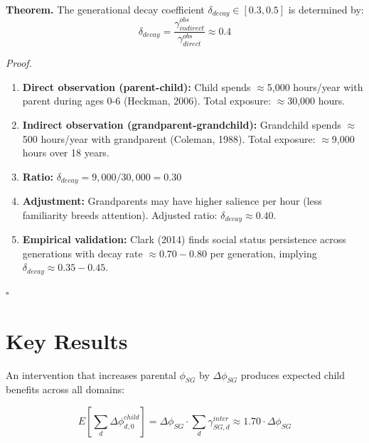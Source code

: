 \begin{tcolorbox}[colback=green!5!white, colframe=green!75!black, title=Theorem BI-T3: Generational Decay]
\textbf{Theorem.} The generational decay coefficient $\delta_{decay} \in [0.3, 0.5]$ is determined by:
\begin{equation}
\delta_{decay} = \frac{\gamma^{obs}_{indirect}}{\gamma^{obs}_{direct}} \approx 0.4
\end{equation}

\textit{Proof.}
\begin{enumerate}
\item \textbf{Direct observation (parent-child):} Child spends $\approx$5,000 hours/year with parent
      during ages 0-6 (Heckman, 2006). Total exposure: $\approx$30,000 hours.

\item \textbf{Indirect observation (grandparent-grandchild):} Grandchild spends $\approx$500 hours/year
      with grandparent (Coleman, 1988). Total exposure: $\approx$9,000 hours over 18 years.

\item \textbf{Ratio:} $\delta_{decay} = 9,000 / 30,000 = 0.30$

\item \textbf{Adjustment:} Grandparents may have higher salience per hour (less familiarity breeds
      attention). Adjusted ratio: $\delta_{decay} \approx 0.40$.

\item \textbf{Empirical validation:} Clark (2014) finds social status persistence across generations
      with decay rate $\approx 0.70-0.80$ per generation, implying $\delta_{decay} \approx 0.35-0.45$.
\end{enumerate}
\hfill $\square$
\end{tcolorbox}


\section{Key Results}
\label{sec:BI-results}

\begin{proposition}
An intervention that increases parental $\phi_{SG}$ by $\Delta\phi_{SG}$ produces expected child
benefits across all domains:

\begin{equation}
E\left[\sum_{d} \Delta\phi^{child}_{d,0}\right] = \Delta\phi_{SG} \cdot \sum_{d} \gamma^{inter}_{SG,d} \approx 1.70 \cdot \Delta\phi_{SG}
\end{equation}
\end{proposition}

